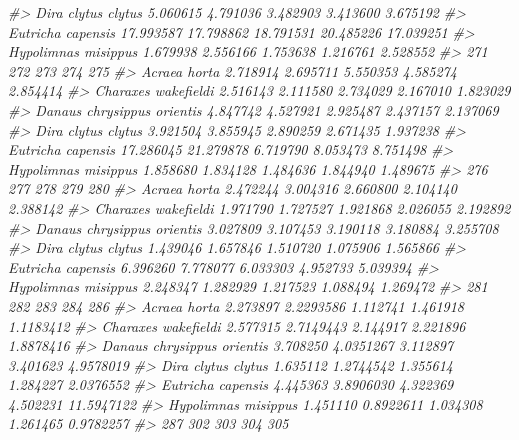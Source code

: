 \documentclass[
]{article}
\newenvironment{Shaded}{\begin{snugshade}}{\end{snugshade}}
\newcommand{\CommentTok}[1]{\textcolor[rgb]{0.56,0.35,0.01}{\textit{#1}}}
\begin{document}
\begin{Shaded}
\begin{Highlighting}[]
\CommentTok{\#\textgreater{} Dira clytus clytus          5.060615  4.791036  3.482903  3.413600  3.675192}
\CommentTok{\#\textgreater{} Eutricha capensis          17.993587 17.798862 18.791531 20.485226 17.039251}
\CommentTok{\#\textgreater{} Hypolimnas misippus         1.679938  2.556166  1.753638  1.216761  2.528552}
\CommentTok{\#\textgreater{}                                  271       272      273      274      275}
\CommentTok{\#\textgreater{} Acraea horta                2.718914  2.695711 5.550353 4.585274 2.854414}
\CommentTok{\#\textgreater{} Charaxes wakefieldi         2.516143  2.111580 2.734029 2.167010 1.823029}
\CommentTok{\#\textgreater{} Danaus chrysippus orientis  4.847742  4.527921 2.925487 2.437157 2.137069}
\CommentTok{\#\textgreater{} Dira clytus clytus          3.921504  3.855945 2.890259 2.671435 1.937238}
\CommentTok{\#\textgreater{} Eutricha capensis          17.286045 21.279878 6.719790 8.053473 8.751498}
\CommentTok{\#\textgreater{} Hypolimnas misippus         1.858680  1.834128 1.484636 1.844940 1.489675}
\CommentTok{\#\textgreater{}                                 276      277      278      279      280}
\CommentTok{\#\textgreater{} Acraea horta               2.472244 3.004316 2.660800 2.104140 2.388142}
\CommentTok{\#\textgreater{} Charaxes wakefieldi        1.971790 1.727527 1.921868 2.026055 2.192892}
\CommentTok{\#\textgreater{} Danaus chrysippus orientis 3.027809 3.107453 3.190118 3.180884 3.255708}
\CommentTok{\#\textgreater{} Dira clytus clytus         1.439046 1.657846 1.510720 1.075906 1.565866}
\CommentTok{\#\textgreater{} Eutricha capensis          6.396260 7.778077 6.033303 4.952733 5.039394}
\CommentTok{\#\textgreater{} Hypolimnas misippus        2.248347 1.282929 1.217523 1.088494 1.269472}
\CommentTok{\#\textgreater{}                                 281       282      283      284        286}
\CommentTok{\#\textgreater{} Acraea horta               2.273897 2.2293586 1.112741 1.461918  1.1183412}
\CommentTok{\#\textgreater{} Charaxes wakefieldi        2.577315 2.7149443 2.144917 2.221896  1.8878416}
\CommentTok{\#\textgreater{} Danaus chrysippus orientis 3.708250 4.0351267 3.112897 3.401623  4.9578019}
\CommentTok{\#\textgreater{} Dira clytus clytus         1.635112 1.2744542 1.355614 1.284227  2.0376552}
\CommentTok{\#\textgreater{} Eutricha capensis          4.445363 3.8906030 4.322369 4.502231 11.5947122}
\CommentTok{\#\textgreater{} Hypolimnas misippus        1.451110 0.8922611 1.034308 1.261465  0.9782257}
\CommentTok{\#\textgreater{}                                   287       302       303       304       305}

\end{Highlighting}
\end{Shaded}
\end{document}
